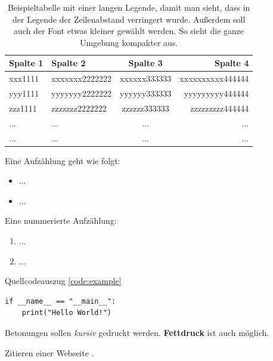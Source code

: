 \begin{table}[htb]
  \centering
  \begin{tabular}{p{2.7cm}lcr}
    \toprule
    \textbf{Spalte 1} 
    & \textbf{Spalte 2} 
    & \textbf{Spalte 3} 
    & \textbf{Spalte 4} \\
    \midrule
    xxx1111
    & xxxxxxx2222222
    & xxxxxx333333 
    & xxxxxxxxxx444444 \\

    yyy1111
    & yyyyyyy2222222
    & yyyyyy333333 
    & yyyyyyyyy444444 \\
    \addlinespace 

    zzz1111
    & zzzzzzz2222222
    & zzzzzz333333 
    & zzzzzzzzz444444 \\

    ...
    & ...
    & ...
    & ...\\
    ...
    & ...
    & ...
    & ...\\
    \bottomrule
  \end{tabular}
  \caption[Beispieltabelle mit langer Legende]{Beispieltabelle mit einer langen Legende, damit man sieht, dass in der Legende der Zeilenabstand verringert wurde. Außerdem soll auch der Font etwas kleiner gewählt werden. So sieht die ganze Umgebung kompakter aus.}
  \label{tab:tabelle_1}
\end{table}

Eine Aufzählung geht wie folgt:
\begin{itemize}
	\item ...
	\item ...
\end{itemize}
Eine nummerierte Aufzählung:
\begin{enumerate}
	\item ...
	\item ...
\end{enumerate}

Quellcodeauszug \ref{code:example}
\begin{lstlisting}[style=colorEX,language=PythonPlus,caption={Beispielcode},label={code:example}]
if __name__ == "__main__":
    print("Hello World!")
\end{lstlisting}


Betonungen sollen \emph{kursiv} gedruckt werden. 
\textbf{Fettdruck} ist auch möglich.

Zitieren einer Webseite \cite{webpage}.



